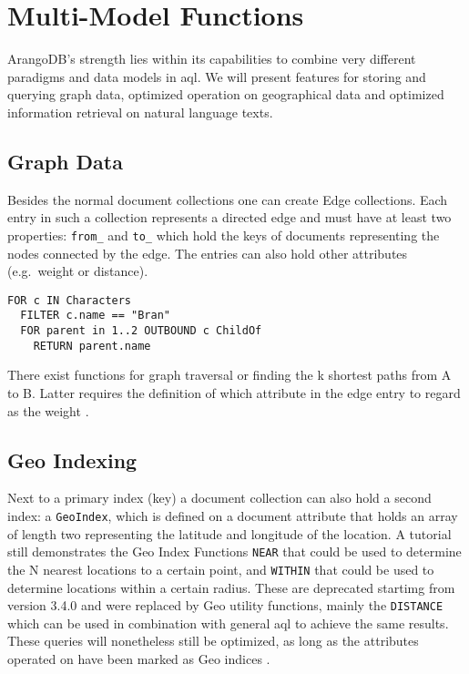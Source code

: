 \section{Multi-Model Functions}

ArangoDB's strength lies within its capabilities to combine very different paradigms and data models in \gls{aql}. We will present features for storing and querying graph data, optimized operation on geographical data and optimized information retrieval on natural language texts.

\subsection{Graph Data}

Besides the normal document collections one can create Edge collections. Each entry in such a collection represents a directed edge and must have at least two properties: \texttt{from\_} and \texttt{to\_} which hold the keys of documents representing the nodes connected by the edge. The entries can also hold other attributes (e.g.\ weight or distance). 

\begin{lstlisting}[language=ArangoQL,caption={Combining graph and relational data: Looks for a character and uses out-going edges of type \texttt{ChildOf} (= incoming edges of type \texttt{ParentOf}) to determine the character's parents and grandparents.}]
FOR c IN Characters
  FILTER c.name == "Bran"
  FOR parent in 1..2 OUTBOUND c ChildOf
    RETURN parent.name
\end{lstlisting}

There exist functions for graph traversal or finding the k shortest paths from A to B. Latter requires the definition of which attribute in the edge entry to regard as the weight \parencite{ShortestPath}.

\subsection{Geo Indexing}

Next to a primary index (key) a document collection can also hold a second index: a \texttt{GeoIndex}, which is defined on a document attribute that holds an array of length two representing the latitude and longitude of the location. A tutorial \parencite{GeoTut} still demonstrates the Geo Index Functions \texttt{NEAR} that could be used to determine the N nearest locations to a certain point, and \texttt{WITHIN} that could be used to determine locations within a certain radius.
These are deprecated startimg from version 3.4.0 and were replaced by Geo utility functions, mainly the \texttt{DISTANCE} which can be used in combination with general \gls{aql} to achieve the same results. These queries will nonetheless still be optimized, as long as the attributes operated on have been marked as Geo indices \parencite{GeoFunc}.

